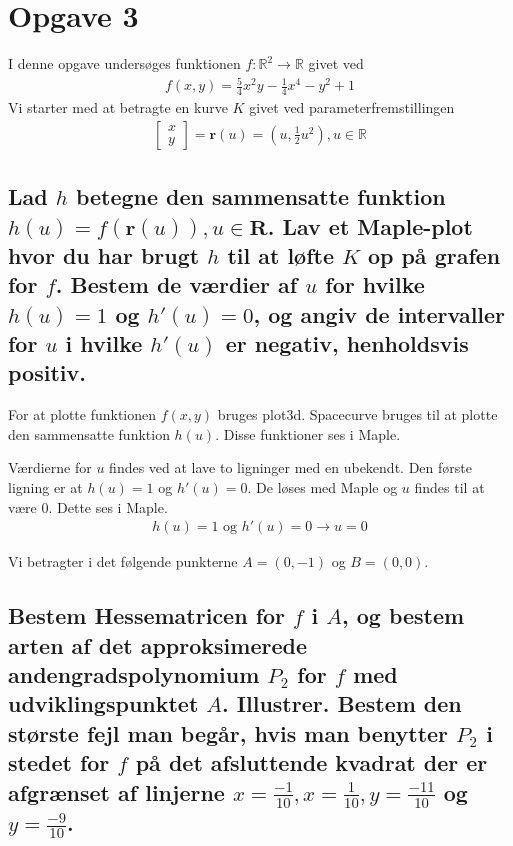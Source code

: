 \section{Opgave 3}
I denne opgave undersøges funktionen $f:\mathbb{R}^2 \rightarrow \mathbb{R}$ givet ved
\begin{align*}
f(x,y) = \frac{5}{4} x^2 y-\frac14 x^4 -y^2+1
\end{align*}
Vi starter med at betragte en kurve $K$ givet ved parameterfremstillingen
\begin{align}
\left[
    \begin{array}{c}
        x\\y
    \end{array}
\right] 
= \textbf{r}(u) = \left(u,\frac12 u^2 \right), u\in \mathbb{R}
\end{align}
\subsection{Lad $h$ betegne den sammensatte funktion $h(u)=f(\textbf{r}(u)),u\in \textbf{R}$. Lav et Maple-plot hvor du har brugt $h$ til at løfte $K$ op på grafen for $f$. Bestem de værdier af $u$ for hvilke $h(u)=1$ og $h'(u)=0$, og angiv de intervaller for $u$ i hvilke $h'(u)$ er negativ, henholdsvis positiv.}

For at plotte funktionen $f(x,y)$ bruges plot3d. Spacecurve bruges til at plotte den sammensatte funktion $h(u)$. Disse funktioner ses i Maple.

Værdierne for $u$ findes ved at lave to ligninger med en ubekendt. Den første ligning er at $h(u)=1$ og $h'(u)=0$. De løses med Maple og $u$ findes til at være 0. Dette ses i Maple.
\begin{align}
    h(u)=1 \text{ og } h'(u)=0 \rightarrow u=0
\end{align}



Vi betragter i det følgende punkterne $A = (0,-1)$ og $B=(0,0)$.

\subsection{Bestem Hessematricen for $f$ i $A$, og bestem arten af det approksimerede andengradspolynomium $P_2$ for $f$ med udviklingspunktet $A$. Illustrer. Bestem den største fejl man begår, hvis man benytter $P_2$ i stedet for $f$ på det afsluttende kvadrat der er afgrænset af linjerne $x=\frac{-1}{10},x=\frac{1}{10},y=\frac{-11}{10}$ og $y=\frac{-9}{10}$.}

